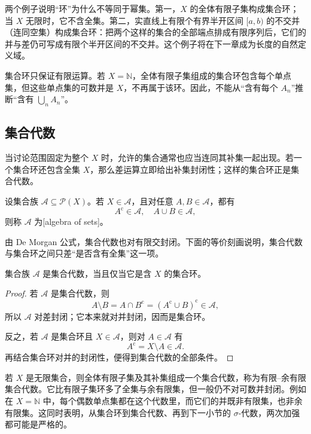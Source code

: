 两个例子说明“环”为什么不等同于幂集。第一，\(X\) 的全体有限子集构成集合环；当 \(X\) 无限时，它不含全集。第二，实直线上有限个有界半开区间 \([a,b)\) 的不交并（连同空集）构成集合环：把两个这样的集合的全部端点排成有限序列后，它们的并与差仍可写成有限个半开区间的不交并。这个例子将在下一章成为长度的自然定义域。

\ProseParagraphBreak

集合环只保证有限运算。若 \(X=\mathbb N\)，全体有限子集组成的集合环包含每个单点集，但这些单点集的可数并是 \(X\)，不再属于该环。因此，不能从“含有每个 \(A_n\)”推断“含有 \(\bigcup_nA_n\)”。

\subsection{集合代数}
\label{b1:subsec:010102}

当讨论范围固定为整个 \(X\) 时，允许的集合通常也应当连同其补集一起出现。若一个集合环还包含全集 \(X\)，那么差运算立即给出补集封闭性；这样的集合环正是集合代数。

\begin{definition}
\label{b1:def:set-algebra}
设集合族 \(\mathcal A\subseteq\mathcal P(X)\)。若 \(X\in\mathcal A\)，且对任意 \(A,B\in\mathcal A\)，都有
\[
A^{\mathrm c}\in\mathcal A,
\quad
A\cup B\in\mathcal A,
\]
则称 \(\mathcal A\) 为[algebra of sets]。
\end{definition}

由 De Morgan 公式，集合代数也对有限交封闭。下面的等价刻画说明，集合代数与集合环之间只差“是否含有全集”这一项。

\begin{proposition}
\label{b1:prop:algebra-ring}
集合族 \(\mathcal A\) 是集合代数，当且仅当它是含 \(X\) 的集合环。
\end{proposition}
\begin{proof}
若 \(\mathcal A\) 是集合代数，则
\[
A\setminus B=A\cap B^{\mathrm c}
=\left(A^{\mathrm c}\cup B\right)^{\mathrm c}\in\mathcal A,
\]
所以 \(\mathcal A\) 对差封闭；它本来就对并封闭，因而是集合环。

反之，若 \(\mathcal A\) 是集合环且 \(X\in\mathcal A\)，则对 \(A\in\mathcal A\) 有
\[
A^{\mathrm c}=X\setminus A\in\mathcal A.
\]
再结合集合环对并的封闭性，便得到集合代数的全部条件。
\end{proof}

若 \(X\) 是无限集合，则全体有限子集及其补集组成一个集合代数，称为有限--余有限集合代数。它比有限子集环多了全集与余有限集，但一般仍不对可数并封闭。例如在 \(X=\mathbb N\) 中，每个偶数单点集都在这个代数里，而它们的并既非有限集，也非余有限集。这同时表明，从集合环到集合代数、再到下一小节的 \(\sigma\)-代数，两次加强都可能是严格的。

